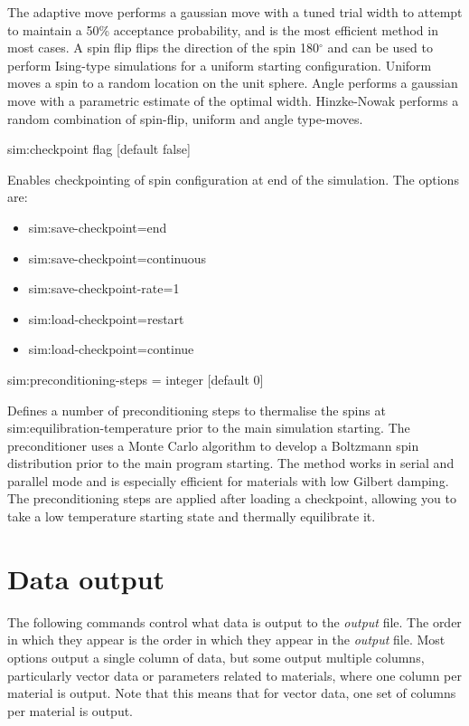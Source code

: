 The adaptive move performs a gaussian move with a tuned trial width to attempt to maintain a 50\% acceptance probability, and is the most efficient method in most cases. A spin flip flips the direction of the spin 180$^{\circ}$ and can be used to perform Ising-type simulations for a uniform starting configuration. Uniform moves a spin to a random location on the unit sphere. Angle performs a gaussian move with a parametric estimate of the optimal width. Hinzke-Nowak performs a random combination of spin-flip, uniform and angle type-moves.

{\zicf sim:checkpoint flag [default false]} Enables checkpointing of spin configuration at end of the simulation. The options are:

\begin{itemize}
  \item[] sim:save-checkpoint=end
  \item[] sim:save-checkpoint=continuous
  \item[] sim:save-checkpoint-rate=1
  \item[] sim:load-checkpoint=restart
  \item[] sim:load-checkpoint=continue
\end{itemize}

{\zicf sim:preconditioning-steps = integer [default 0]} Defines a number of preconditioning steps to thermalise the spins at sim:equilibration-temperature prior to the main simulation starting. The preconditioner uses a Monte Carlo algorithm to develop a Boltzmann spin distribution prior to the main program starting. The method works in serial and parallel mode and is especially efficient for materials with low Gilbert damping. The preconditioning steps are applied after loading a checkpoint, allowing you to take a low temperature starting state and thermally equilibrate it.

\section*{Data output}
The following commands control what data is output to the \textit{output} file. The order in which they appear is the order in which they appear in the \textit{output} file. Most options output a single column of data, but some output multiple columns, particularly vector data or parameters related to materials, where one column per material is output. Note that this means that for vector data, one set of columns per material is output.

